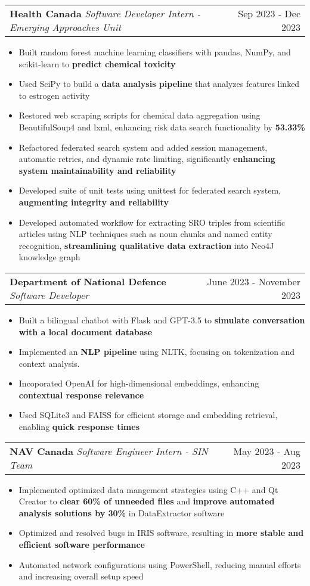 \documentclass[letterpaper,11pt]{article}
\makeatletter
\newcommand{\resumeItem}[1]{
  \item\small{
    {#1 \vspace{-2pt}}
  }
}
\newcommand{\resumeSubheading}[3]{
    \item
    \begin{tabular*}{0.97\textwidth}[t]{l@{\extracolsep{\fill}}r}
      \textbf{#1} \textbar \textit{ #2} & #3 \\
    \end{tabular*}\vspace{-4.5pt}
}
\newcommand{\resumeItemListStart}{\begin{itemize}}
\newcommand{\resumeItemListEnd}{\end{itemize}\vspace{-5pt}}
\makeatother
\begin{document}
    \resumeSubheading
      {Health Canada}{Software Developer Intern - Emerging Approaches Unit}{Sep 2023 - Dec 2023}
      \resumeItemListStart
        \resumeItem{Built random forest machine learning classifiers with pandas, NumPy, and scikit-learn to \textbf{predict chemical toxicity}}
        \resumeItem{Used SciPy to build a \textbf{data analysis pipeline} that analyzes features linked to estrogen activity}
        \resumeItem{Restored web scraping scripts for chemical data aggregation using BeautifulSoup4 and lxml, enhancing risk data search functionality by \textbf{53.33\%}}
        \resumeItem{Refactored federated search system and added session management, automatic retries, and dynamic rate limiting, significantly \textbf{enhancing system maintainability and reliability}}
        \resumeItem{Developed suite of unit tests using unittest for federated search system, \textbf{augmenting integrity and reliability}}
        \resumeItem{Developed automated workflow for extracting SRO triples from scientific articles using NLP techniques such as noun chunks and named entity recognition, \textbf{streamlining qualitative data extraction} into Neo4J knowledge graph}
      \resumeItemListEnd

    \resumeSubheading
    {Department of National Defence}{Software Developer}{June 2023 - November 2023}
      \resumeItemListStart
        \resumeItem{Built a bilingual chatbot with Flask and GPT-3.5 to \textbf{simulate conversation with a local document database}}
        \resumeItem{Implemented an \textbf{NLP pipeline} using NLTK, focusing on tokenization and context analysis.}
        \resumeItem{Incoporated OpenAI for high-dimensional embeddings, enhancing \textbf{contextual response relevance}}
        \resumeItem{Used SQLite3 and FAISS for efficient storage and embedding retrieval, enabling \textbf{quick response times}}
      \resumeItemListEnd

    \resumeSubheading
    {NAV Canada}{Software Engineer Intern - SIN Team}{May 2023 - Aug 2023}
      \resumeItemListStart
        \resumeItem{Implemented optimized data mangement strategies using C++ and Qt Creator to \textbf{clear 60\% of unneeded files} and \textbf{improve automated analysis solutions by 30\%} in DataExtractor software}
        \resumeItem{Optimized and resolved bugs in IRIS software, resulting in \textbf{more stable and efficient software performance}}
        \resumeItem{Automated network configurations using PowerShell, reducing manual efforts and increasing overall setup speed}
      \resumeItemListEnd
\end{document}

